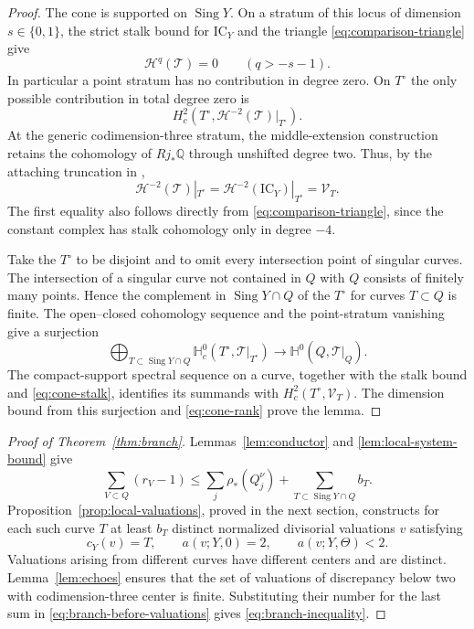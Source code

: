 \begin{proof}
The cone is supported on $\operatorname{Sing}Y$.  On a stratum
of this locus of dimension $s\in\{0,1\}$, the strict stalk bound
for $\mathrm{IC}_Y$ and the triangle
\eqref{eq:comparison-triangle} give
\[
 \mathcal H^q(\mathcal T)=0\qquad(q>-s-1).
\]
In particular a point stratum has no contribution in degree zero.
On $T^\circ$ the only possible contribution in total degree zero
is
\[
 H_c^2(T^\circ,\mathcal H^{-2}(\mathcal T)|_{T^\circ}).
\]
At the generic codimension-three stratum, the middle-extension
construction retains the cohomology of $Rj_*\mathbb Q$ through
unshifted degree two.  Thus, by the attaching truncation in
\cite[\S3.1 and \S3.3, axiom {\rm[AX1]}(d)]{GM1983},
\begin{equation}\label{eq:cone-stalk}
 \mathcal H^{-2}(\mathcal T)|_{T^\circ}
 =\mathcal H^{-2}(\mathrm{IC}_Y)|_{T^\circ}
 =\mathcal V_T.
\end{equation}
The first equality also follows directly from
\eqref{eq:comparison-triangle}, since the constant complex has
stalk cohomology only in degree $-4$.

Take the $T^\circ$ to be disjoint and to omit every intersection
point of singular curves.  The intersection of a singular curve
not contained in $Q$ with $Q$ consists of finitely many points.
Hence the complement in $\operatorname{Sing}Y\cap Q$ of the
$T^\circ$ for curves $T\subset Q$ is finite.  The open--closed
cohomology sequence and the point-stratum vanishing give a
surjection
\[
 \bigoplus_{T\subset\operatorname{Sing}Y\cap Q}
 \mathbb H_c^0(T^\circ,\mathcal T|_{T^\circ})
 \longrightarrow\mathbb H^0(Q,\mathcal T|_Q).
\]
The compact-support spectral sequence on a curve, together with
the stalk bound and \eqref{eq:cone-stalk}, identifies its summands
with $H_c^2(T^\circ,\mathcal V_T)$.  The dimension bound from this
surjection and \eqref{eq:cone-rank} prove the lemma.
\end{proof}

\begin{proof}[Proof of Theorem~\ref{thm:branch}]
Lemmas~\ref{lem:conductor} and \ref{lem:local-system-bound} give
\begin{equation}\label{eq:branch-before-valuations}
 \sum_{V\subset Q}(r_V-1)
 \leq\sum_j\rho_*(Q_j^\nu)
   +\sum_{T\subset\operatorname{Sing}Y\cap Q}b_T.
\end{equation}
Proposition~\ref{prop:local-valuations}, proved in the next section,
constructs for each such curve $T$ at least $b_T$ distinct
normalized divisorial valuations $v$ satisfying
\[
 c_Y(v)=T,\qquad a(v;Y,0)=2,\qquad a(v;Y,\Theta)<2.
\]
Valuations arising from different curves have different centers
and are distinct.  Lemma~\ref{lem:echoes} ensures that the set of
valuations of discrepancy below two with codimension-three center
is finite.  Substituting their number for the last sum in
\eqref{eq:branch-before-valuations} gives
\eqref{eq:branch-inequality}.
\end{proof}
